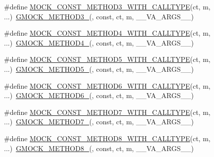 \begin{DoxyCompactItemize}
\item 
\#define \hyperlink{gmock-generated-function-mockers_8h_ac10e04e26db63b6c2a452e05d3c89db8}{M\+O\+C\+K\+\_\+\+C\+O\+N\+S\+T\+\_\+\+M\+E\+T\+H\+O\+D3\+\_\+\+W\+I\+T\+H\+\_\+\+C\+A\+L\+L\+T\+Y\+PE}(ct,  m, ...)~\hyperlink{gmock-generated-function-mockers_8h_af7c77ba511c631de02bb8c45a6ed3045}{G\+M\+O\+C\+K\+\_\+\+M\+E\+T\+H\+O\+D3\+\_\+}(, const, ct, m, \+\_\+\+\_\+\+V\+A\+\_\+\+A\+R\+G\+S\+\_\+\+\_\+)
\item 
\#define \hyperlink{gmock-generated-function-mockers_8h_a15229a3933a49f5099ee010c6dcaadeb}{M\+O\+C\+K\+\_\+\+C\+O\+N\+S\+T\+\_\+\+M\+E\+T\+H\+O\+D4\+\_\+\+W\+I\+T\+H\+\_\+\+C\+A\+L\+L\+T\+Y\+PE}(ct,  m, ...)~\hyperlink{gmock-generated-function-mockers_8h_ab6430f2cfad9de4aca5258ea559294bb}{G\+M\+O\+C\+K\+\_\+\+M\+E\+T\+H\+O\+D4\+\_\+}(, const, ct, m, \+\_\+\+\_\+\+V\+A\+\_\+\+A\+R\+G\+S\+\_\+\+\_\+)
\item 
\#define \hyperlink{gmock-generated-function-mockers_8h_a8d5e56fa6111cd7ee468e6dacf8691b9}{M\+O\+C\+K\+\_\+\+C\+O\+N\+S\+T\+\_\+\+M\+E\+T\+H\+O\+D5\+\_\+\+W\+I\+T\+H\+\_\+\+C\+A\+L\+L\+T\+Y\+PE}(ct,  m, ...)~\hyperlink{gmock-generated-function-mockers_8h_a9e3ecd392499ab19a4a6d3adcabf56f6}{G\+M\+O\+C\+K\+\_\+\+M\+E\+T\+H\+O\+D5\+\_\+}(, const, ct, m, \+\_\+\+\_\+\+V\+A\+\_\+\+A\+R\+G\+S\+\_\+\+\_\+)
\item 
\#define \hyperlink{gmock-generated-function-mockers_8h_a2d904ee47040f643e7b534c22603dd90}{M\+O\+C\+K\+\_\+\+C\+O\+N\+S\+T\+\_\+\+M\+E\+T\+H\+O\+D6\+\_\+\+W\+I\+T\+H\+\_\+\+C\+A\+L\+L\+T\+Y\+PE}(ct,  m, ...)~\hyperlink{gmock-generated-function-mockers_8h_ad0ca7f6973a076d0af4c953f8ed91842}{G\+M\+O\+C\+K\+\_\+\+M\+E\+T\+H\+O\+D6\+\_\+}(, const, ct, m, \+\_\+\+\_\+\+V\+A\+\_\+\+A\+R\+G\+S\+\_\+\+\_\+)
\item 
\#define \hyperlink{gmock-generated-function-mockers_8h_a66076ace4a10740c553080e5273f69c3}{M\+O\+C\+K\+\_\+\+C\+O\+N\+S\+T\+\_\+\+M\+E\+T\+H\+O\+D7\+\_\+\+W\+I\+T\+H\+\_\+\+C\+A\+L\+L\+T\+Y\+PE}(ct,  m, ...)~\hyperlink{gmock-generated-function-mockers_8h_ab98a8399ba62b53b375c2807f4d39d2f}{G\+M\+O\+C\+K\+\_\+\+M\+E\+T\+H\+O\+D7\+\_\+}(, const, ct, m, \+\_\+\+\_\+\+V\+A\+\_\+\+A\+R\+G\+S\+\_\+\+\_\+)
\item 
\#define \hyperlink{gmock-generated-function-mockers_8h_ab66f6bb289f1105f7c0dac3421c4a7f5}{M\+O\+C\+K\+\_\+\+C\+O\+N\+S\+T\+\_\+\+M\+E\+T\+H\+O\+D8\+\_\+\+W\+I\+T\+H\+\_\+\+C\+A\+L\+L\+T\+Y\+PE}(ct,  m, ...)~\hyperlink{gmock-generated-function-mockers_8h_aa84a36427c44505207b7cad5dec7ad67}{G\+M\+O\+C\+K\+\_\+\+M\+E\+T\+H\+O\+D8\+\_\+}(, const, ct, m, \+\_\+\+\_\+\+V\+A\+\_\+\+A\+R\+G\+S\+\_\+\+\_\+)

\end{DoxyCompactItemize}
